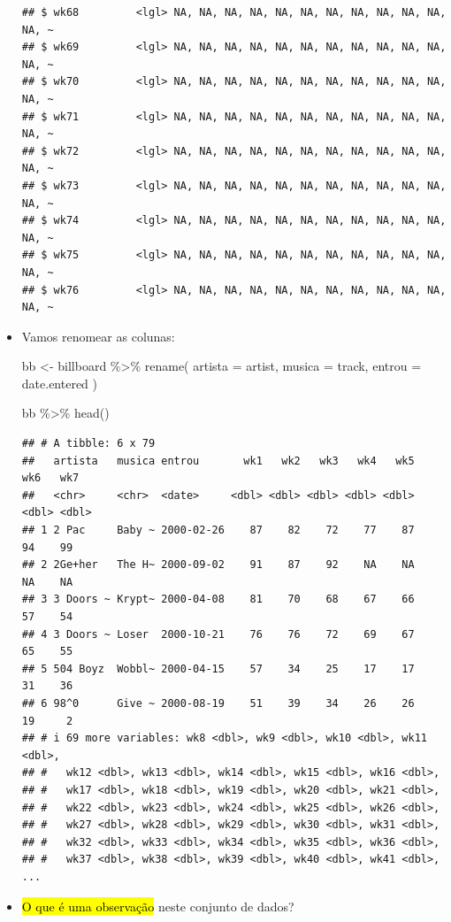 \documentclass[
  11pt]{report}
\newenvironment{Shaded}{\begin{snugshade}}{\end{snugshade}}
\newcommand{\AttributeTok}[1]{\textcolor[rgb]{0.77,0.63,0.00}{#1}}
\newcommand{\FunctionTok}[1]{\textcolor[rgb]{0.00,0.00,0.00}{#1}}
\newcommand{\NormalTok}[1]{#1}
\newcommand{\OtherTok}[1]{\textcolor[rgb]{0.56,0.35,0.01}{#1}}
\newcommand{\SpecialCharTok}[1]{\textcolor[rgb]{0.00,0.00,0.00}{#1}}
\renewenvironment{Shaded}{
    \begin{mdframed}[%
      roundcorner=2pt,%
      innerleftmargin=5pt,%
      innerrightmargin=5pt,%
      topline=true,%
      leftline=true,%
      rightline=true,%
      bottomline=true,%
      linewidth=0.5pt,%
      linecolor=black!20,%
      backgroundcolor=black!2,%
      skipabove=2ex,%
      skipbelow=2.5ex%
    ]%
  }
  {
    \end{mdframed}
  }
\begin{document}
\begin{itemize}
\begin{verbatim}
## $ wk68         <lgl> NA, NA, NA, NA, NA, NA, NA, NA, NA, NA, NA, NA, ~
## $ wk69         <lgl> NA, NA, NA, NA, NA, NA, NA, NA, NA, NA, NA, NA, ~
## $ wk70         <lgl> NA, NA, NA, NA, NA, NA, NA, NA, NA, NA, NA, NA, ~
## $ wk71         <lgl> NA, NA, NA, NA, NA, NA, NA, NA, NA, NA, NA, NA, ~
## $ wk72         <lgl> NA, NA, NA, NA, NA, NA, NA, NA, NA, NA, NA, NA, ~
## $ wk73         <lgl> NA, NA, NA, NA, NA, NA, NA, NA, NA, NA, NA, NA, ~
## $ wk74         <lgl> NA, NA, NA, NA, NA, NA, NA, NA, NA, NA, NA, NA, ~
## $ wk75         <lgl> NA, NA, NA, NA, NA, NA, NA, NA, NA, NA, NA, NA, ~
## $ wk76         <lgl> NA, NA, NA, NA, NA, NA, NA, NA, NA, NA, NA, NA, ~
\end{verbatim}
\item
  Vamos renomear as colunas:

\begin{Shaded}
\begin{Highlighting}[]
\NormalTok{bb }\OtherTok{\textless{}{-}}\NormalTok{ billboard }\SpecialCharTok{\%\textgreater{}\%} 
  \FunctionTok{rename}\NormalTok{(}
    \AttributeTok{artista =}\NormalTok{ artist,}
    \AttributeTok{musica =}\NormalTok{ track,}
    \AttributeTok{entrou =}\NormalTok{ date.entered}
\NormalTok{  )}
\end{Highlighting}
\end{Shaded}

\begin{Shaded}
\begin{Highlighting}[]
\NormalTok{bb }\SpecialCharTok{\%\textgreater{}\%} \FunctionTok{head}\NormalTok{()}
\end{Highlighting}
\end{Shaded}

\begin{verbatim}
## # A tibble: 6 x 79
##   artista   musica entrou       wk1   wk2   wk3   wk4   wk5   wk6   wk7
##   <chr>     <chr>  <date>     <dbl> <dbl> <dbl> <dbl> <dbl> <dbl> <dbl>
## 1 2 Pac     Baby ~ 2000-02-26    87    82    72    77    87    94    99
## 2 2Ge+her   The H~ 2000-09-02    91    87    92    NA    NA    NA    NA
## 3 3 Doors ~ Krypt~ 2000-04-08    81    70    68    67    66    57    54
## 4 3 Doors ~ Loser  2000-10-21    76    76    72    69    67    65    55
## 5 504 Boyz  Wobbl~ 2000-04-15    57    34    25    17    17    31    36
## 6 98^0      Give ~ 2000-08-19    51    39    34    26    26    19     2
## # i 69 more variables: wk8 <dbl>, wk9 <dbl>, wk10 <dbl>, wk11 <dbl>,
## #   wk12 <dbl>, wk13 <dbl>, wk14 <dbl>, wk15 <dbl>, wk16 <dbl>,
## #   wk17 <dbl>, wk18 <dbl>, wk19 <dbl>, wk20 <dbl>, wk21 <dbl>,
## #   wk22 <dbl>, wk23 <dbl>, wk24 <dbl>, wk25 <dbl>, wk26 <dbl>,
## #   wk27 <dbl>, wk28 <dbl>, wk29 <dbl>, wk30 <dbl>, wk31 <dbl>,
## #   wk32 <dbl>, wk33 <dbl>, wk34 <dbl>, wk35 <dbl>, wk36 <dbl>,
## #   wk37 <dbl>, wk38 <dbl>, wk39 <dbl>, wk40 <dbl>, wk41 <dbl>, ...
\end{verbatim}
\item
  {\hl{O que é uma observação}} neste conjunto de dados?


\end{itemize}
\end{document}
